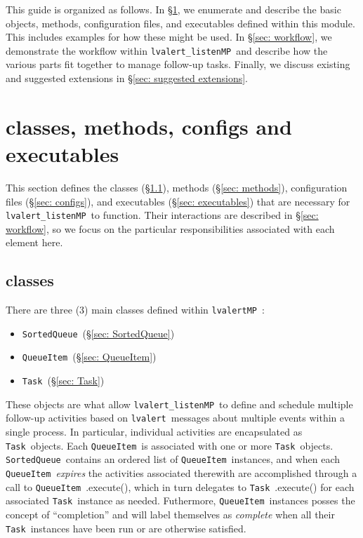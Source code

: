 \documentclass{article}
\newcommand{\alert}{\texttt{lvalert}~}
\newcommand{\lvalertMP}{\texttt{lvalertMP}~}
\newcommand{\lvalertListenMP}{\texttt{lvalert\_listenMP}~}
\newcommand{\SortedQueue}{\texttt{SortedQueue}~}
\newcommand{\QueueItem}{\texttt{QueueItem}~}
\newcommand{\Task}{\texttt{Task}~}
\begin{document}
This guide is organized as follows. In \S\ref{sec: classes, methods, configs and executables}, we enumerate and describe the basic objects, methods, configuration files, and executables defined within this module. 
This includes examples for how these might be used.
In \S\ref{sec: workflow}, we demonstrate the workflow within \lvalertListenMP and describe how the various parts fit together to manage follow-up tasks.
Finally, we discuss existing and suggested extensions in \S\ref{sec: suggested extensions}.


\section{classes, methods, configs and executables}
\label{sec: classes, methods, configs and executables}

This section defines the classes (\S\ref{sec: classes}), methods (\S\ref{sec: methods}), configuration files (\S\ref{sec: configs}), and executables (\S\ref{sec: executables}) that are necessary for \lvalertListenMP to function. 
Their interactions are described in \S\ref{sec: workflow}, so we focus on the particular responsibilities associated with each element here.


\subsection{classes}
\label{sec: classes}

There are three (3) main classes defined within \lvalertMP:
\begin{itemize}
    \item{\SortedQueue (\S\ref{sec: SortedQueue})}
    \item{\QueueItem (\S\ref{sec: QueueItem})}
    \item{\Task (\S\ref{sec: Task})}
\end{itemize}
These objects are what allow \lvalertListenMP to define and schedule multiple follow-up activities based on \alert messages about multiple events within a single process.
In particular, individual activities are encapsulated as \Task objects.
Each \QueueItem is associated with one or more \Task objects.
\SortedQueue contains an ordered list of \QueueItem instances, and when each \QueueItem \textit{expires} the activities associated therewith are accomplished through a call to \QueueItem.execute(), which in turn delegates to \Task.execute() for each associated \Task instance as needed.
Futhermore, \QueueItem instances posses the concept of ``completion'' and will label themselves as \textit{complete} when all their \Task instances have been run or are otherwise satisfied.
\end{document}
